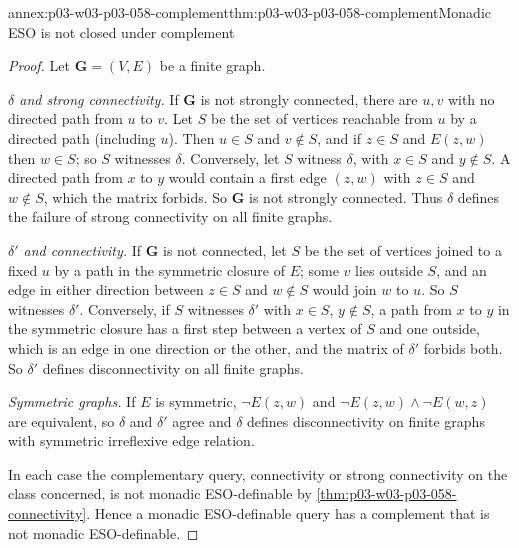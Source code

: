 \begin{annexitem}{annex:p03-w03-p03-058-complement}{thm:p03-w03-p03-058-complement}{Monadic ESO is not closed under complement}
\begin{proof}
Let \(\mathbf G=(V,E)\) be a finite graph.

\emph{\(\delta\) and strong connectivity.} If \(\mathbf G\) is not
strongly connected, there are \(u,v\) with no directed path from \(u\) to
\(v\). Let \(S\) be the set of vertices reachable from \(u\) by a directed
path (including \(u\)). Then \(u\in S\) and \(v\notin S\), and if
\(z\in S\) and \(E(z,w)\) then \(w\in S\); so \(S\) witnesses \(\delta\).
Conversely, let \(S\) witness \(\delta\), with \(x\in S\) and \(y\notin S\).
A directed path from \(x\) to \(y\) would contain a first edge \((z,w)\)
with \(z\in S\) and \(w\notin S\), which the matrix forbids. So \(\mathbf G\)
is not strongly connected. Thus \(\delta\) defines the failure of strong
connectivity on all finite graphs.

\emph{\(\delta'\) and connectivity.} If \(\mathbf G\) is not connected,
let \(S\) be the set of vertices joined to a fixed \(u\) by a path in the
symmetric closure of \(E\); some \(v\) lies outside \(S\), and an edge in
either direction between \(z\in S\) and \(w\notin S\) would join \(w\) to
\(u\). So \(S\) witnesses \(\delta'\). Conversely, if \(S\) witnesses
\(\delta'\) with \(x\in S\), \(y\notin S\), a path from \(x\) to \(y\) in the
symmetric closure has a first step between a vertex of \(S\) and one
outside, which is an edge in one direction or the other, and the matrix of
\(\delta'\) forbids both. So \(\delta'\) defines disconnectivity on all
finite graphs.

\emph{Symmetric graphs.} If \(E\) is symmetric, \(\neg E(z,w)\) and
\(\neg E(z,w)\wedge\neg E(w,z)\) are equivalent, so \(\delta\) and
\(\delta'\) agree and \(\delta\) defines disconnectivity on finite graphs
with symmetric irreflexive edge relation.

In each case the complementary query, connectivity or strong connectivity on
the class concerned, is not monadic ESO-definable by
\cref{thm:p03-w03-p03-058-connectivity}. Hence a monadic ESO-definable query
has a complement that is not monadic ESO-definable.
\end{proof}
\end{annexitem}

